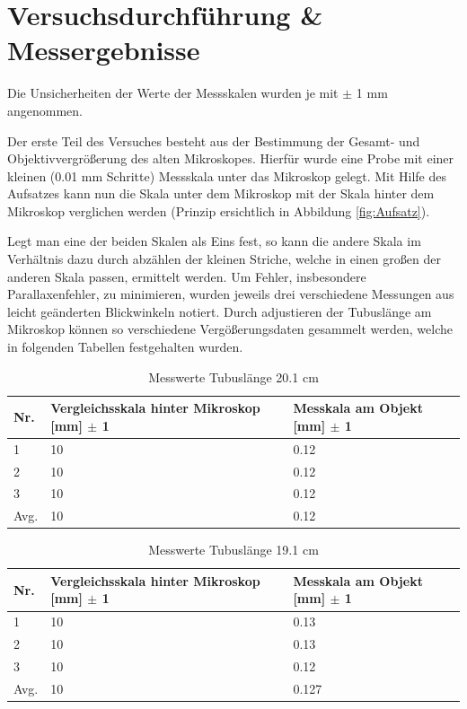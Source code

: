\documentclass[12pt,a4paper,twoside]{article}
\begin{document}
\section{Versuchsdurchführung \& Messergebnisse} %

Die Unsicherheiten der Werte der Messskalen wurden je mit $\pm$ 1 mm angenommen.

Der erste Teil des Versuches besteht aus der Bestimmung der Gesamt- und Objektivvergrößerung des alten Mikroskopes.
Hierfür wurde eine Probe mit einer kleinen (0.01 mm Schritte) Messskala unter das Mikroskop gelegt. 
Mit Hilfe des Aufsatzes kann nun die Skala unter dem Mikroskop mit der Skala hinter dem Mikroskop verglichen werden (Prinzip ersichtlich in Abbildung \ref{fig:Aufsatz}). \newline

\noindent
Legt man eine der beiden Skalen als Eins fest, so kann die andere Skala im Verhältnis dazu durch abzählen der kleinen Striche, welche in einen großen der anderen Skala passen, ermittelt werden.
Um Fehler, insbesondere Parallaxenfehler, zu minimieren, wurden jeweils drei verschiedene Messungen aus leicht geänderten Blickwinkeln notiert.
Durch adjustieren der Tubuslänge am Mikroskop können so verschiedene Vergößerungsdaten gesammelt werden, welche in folgenden Tabellen festgehalten wurden.

\begin{table}[H]
    \centering
    \caption{Messwerte Tubuslänge 20.1 cm}
    \label{tab:messwerteTB20}
    \begin{tabular}{| l | l | l |}
        \hline
        Nr.   & Vergleichsskala hinter Mikroskop [mm] $\pm$ 1  & Messkala am Objekt [mm] $\pm$ 1 \\
        \hline
        1 & 10 & 0.12 \\
        2 & 10 & 0.12 \\
        3 & 10 & 0.12 \\
        \hline
        Avg. & 10 & 0.12 \\
        \hline
    \end{tabular}
\end{table}

\begin{table}[H]
    \centering
    \caption{Messwerte Tubuslänge 19.1 cm}
    \label{tab:messwerteTB19}
    \begin{tabular}{| l | l | l |}
        \hline
        Nr.   & Vergleichsskala hinter Mikroskop [mm] $\pm$ 1 & Messkala am Objekt [mm] $\pm$ 1 \\
        \hline
        1 & 10 & 0.13 \\
        2 & 10 & 0.13 \\
        3 & 10 & 0.12 \\
        \hline
        Avg. & 10 & 0.127 \\
        \hline
    \end{tabular}
\end{table}
\end{document}
